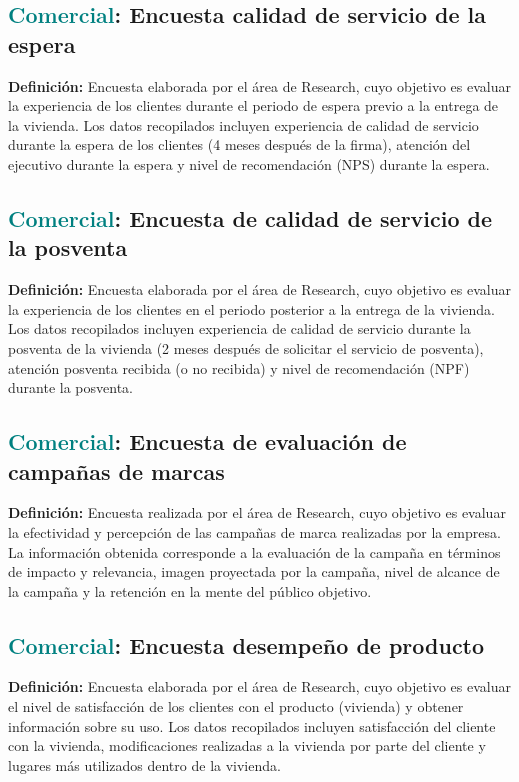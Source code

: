 \documentclass[12pt]{article}
\begin{document}
\subsection{\textcolor{teal}{Comercial}: Encuesta calidad de servicio de la espera}
\textbf{Definición:} Encuesta elaborada por el área de Research, cuyo objetivo es evaluar la experiencia de los clientes durante el periodo de espera previo a la entrega de la vivienda. Los datos recopilados incluyen experiencia de calidad de servicio durante la espera de los clientes (4 meses después de la firma), atención del ejecutivo durante la espera y nivel de recomendación (NPS) durante la espera.
\subsection{\textcolor{teal}{Comercial}: Encuesta de calidad de servicio de la posventa}
\textbf{Definición:} Encuesta elaborada por el área de Research, cuyo objetivo es evaluar la experiencia de los clientes en el periodo posterior a la entrega de la vivienda. Los datos recopilados incluyen experiencia de calidad de servicio durante la posventa de la vivienda (2 meses después de solicitar el servicio de posventa), atención posventa recibida (o no recibida) y nivel de recomendación (NPF) durante la posventa.
\subsection{\textcolor{teal}{Comercial}: Encuesta de evaluación de campañas de marcas}
\textbf{Definición:} Encuesta realizada por el área de Research, cuyo objetivo es evaluar la efectividad y percepción de las campañas de marca realizadas por la empresa. La información obtenida corresponde a la evaluación de la campaña en términos de impacto y relevancia, imagen proyectada por la campaña, nivel de alcance de la campaña y la retención en la mente del público objetivo.
\subsection{\textcolor{teal}{Comercial}: Encuesta desempeño de producto}
\textbf{Definición:} Encuesta elaborada por el área de Research, cuyo objetivo es evaluar el nivel de satisfacción de los clientes con el producto (vivienda) y obtener información sobre su uso. Los datos recopilados incluyen satisfacción del cliente con la vivienda, modificaciones realizadas a la vivienda por parte del cliente y lugares más utilizados dentro de la vivienda.
\end{document}
